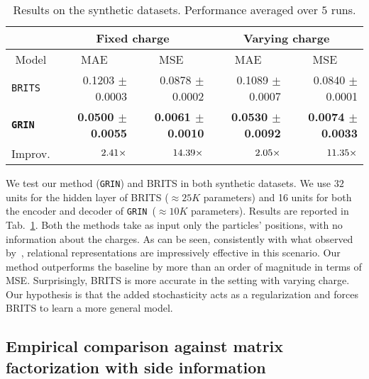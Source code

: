\documentclass{article} \usepackage{iclr2022_conference,times}
\newcommand{\GRIL}{\texttt{GRIN}}
\begin{document}
\begin{table}[ht]
\vspace{-0.2cm}
\caption{Results on the synthetic datasets. Performance averaged over $5$ runs.}
\vspace{0.1cm}
\centering
\begin{tabular}{ l | r | r | r | r }
\toprule
 \multicolumn{1}{c}{} &\multicolumn{2}{c}{Fixed charge} & \multicolumn{2}{c}{Varying charge} \\
\toprule
 \multicolumn{1}{c}{Model}&\multicolumn{1}{|c}{\small MAE} & \multicolumn{1}{|c}{\small MSE} & \multicolumn{1}{|c}{\small MAE} & \multicolumn{1}{|c}{\small MSE} \\
\midrule
\texttt{BRITS} & 0.1203 {\tiny $\pm$ 0.0003} & 0.0878 {\tiny $\pm$ 0.0002} & 0.1089 {\tiny $\pm$ 0.0007} & 0.0840 {\tiny $\pm$ 0.0001}\\
\midrule[0.3pt]
\texttt{\textbf{\GRIL}} & \textbf{0.0500 {\tiny $\pm$ 0.0055}} & \textbf{0.0061 {\tiny $\pm$ 0.0010}} & \textbf{0.0530 {\tiny $\pm$ 0.0092}} & \textbf{0.0074 {\tiny $\pm$ 0.0033}}\\
\midrule
\midrule
Improv. & $2.41\footnotesize{\times}$ & $14.39\footnotesize{\times}$ & $2.05\footnotesize{\times}$ & $11.35\footnotesize{\times}$\\
\bottomrule
\end{tabular}
\label{t:synthetic}
\end{table} 
We test our method (\GRIL) and BRITS in both synthetic datasets. We use $32$ units for the hidden layer of BRITS ($\approx 25K$ parameters) and 16 units for both the encoder and decoder of \GRIL~($\approx 10K$ parameters). Results are reported in Tab.~\ref{t:synthetic}. Both the methods take as input only the particles' positions, with no information about the charges. As can be seen, consistently with what observed by~\citet{kipf2018neural}, relational representations are impressively effective in this scenario. Our method outperforms the baseline by more than an order of magnitude in terms of MSE. Surprisingly, BRITS is more accurate in the setting with varying charge. Our hypothesis is that the added stochasticity acts as a regularization and forces BRITS to learn a more general model.

\subsection{Empirical comparison against matrix factorization with side information}
\end{document}

